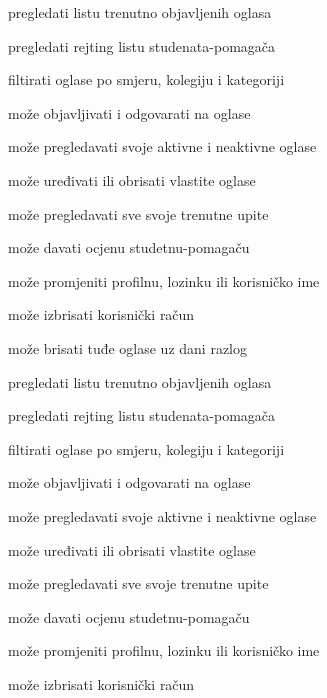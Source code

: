\begin{packed_enum}
\begin{packed_enum}
					\item pregledati listu trenutno objavljenih oglasa
					\item pregledati rejting listu studenata-pomagača
					\item filtirati oglase po smjeru, kolegiju i kategoriji
					\item može objavljivati i odgovarati na oglase
					\item može pregledavati svoje aktivne i neaktivne oglase
					\item može uređivati ili obrisati vlastite oglase
					\item može pregledavati sve svoje trenutne upite
					\item može davati ocjenu studetnu-pomagaču
					\item može promjeniti profilnu, lozinku ili korisničko ime
					\item može izbrisati korisnički račun
					\item može brisati tuđe oglase uz dani razlog
					
				\end{packed_enum}
				
				\item  {}
				
				\begin{packed_enum}
					
					\item pregledati listu trenutno objavljenih oglasa
					\item pregledati rejting listu studenata-pomagača
					\item filtirati oglase po smjeru, kolegiju i kategoriji
					\item može objavljivati i odgovarati na oglase
					\item može pregledavati svoje aktivne i neaktivne oglase
					\item može uređivati ili obrisati vlastite oglase
					\item može pregledavati sve svoje trenutne upite
					\item može davati ocjenu studetnu-pomagaču
					\item može promjeniti profilnu, lozinku ili korisničko ime
					\item može izbrisati korisnički račun
					
				\end{packed_enum}
				
				\item  {}
				

\end{packed_enum}
